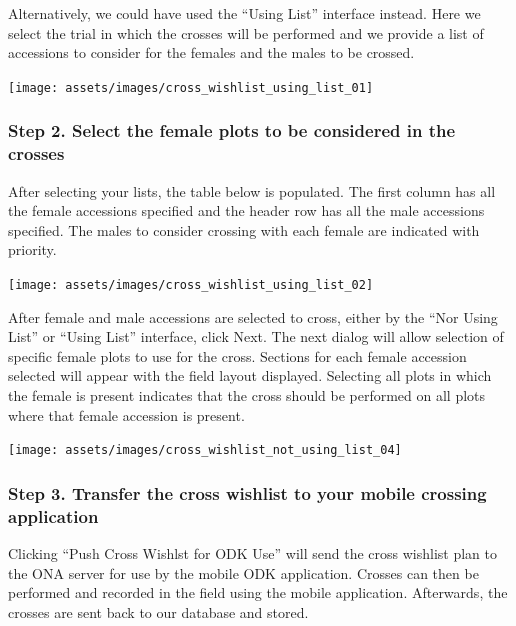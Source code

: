 \documentclass[
  12pt,
]{book}
\begin{document}
Alternatively, we could have used the ``Using List'' interface instead. Here we select the trial in which the crosses will be performed and we provide a list of accessions to consider for the females and the males to be crossed.

\begin{center}\texttt{[image: assets/images/cross\_wishlist\_using\_list\_01]} \end{center}

\hypertarget{step-2.-select-the-female-plots-to-be-considered-in-the-crosses}{%
\subsubsection*{Step 2. Select the female plots to be considered in the crosses}\label{step-2.-select-the-female-plots-to-be-considered-in-the-crosses}}


After selecting your lists, the table below is populated. The first column has all the female accessions specified and the header row has all the male accessions specified. The males to consider crossing with each female are indicated with priority.

\begin{center}\texttt{[image: assets/images/cross\_wishlist\_using\_list\_02]} \end{center}

After female and male accessions are selected to cross, either by the ``Nor Using List'' or ``Using List'' interface, click Next. The next dialog will allow selection of specific female plots to use for the cross. Sections for each female accession selected will appear with the field layout displayed. Selecting all plots in which the female is present indicates that the cross should be performed on all plots where that female accession is present.

\begin{center}\texttt{[image: assets/images/cross\_wishlist\_not\_using\_list\_04]} \end{center}

\hypertarget{step-3.-transfer-the-cross-wishlist-to-your-mobile-crossing-application}{%
\subsubsection*{Step 3. Transfer the cross wishlist to your mobile crossing application}\label{step-3.-transfer-the-cross-wishlist-to-your-mobile-crossing-application}}


Clicking ``Push Cross Wishlst for ODK Use'' will send the cross wishlist plan to the ONA server for use by the mobile ODK application. Crosses can then be performed and recorded in the field using the mobile application. Afterwards, the crosses are sent back to our database and stored.
\end{document}
